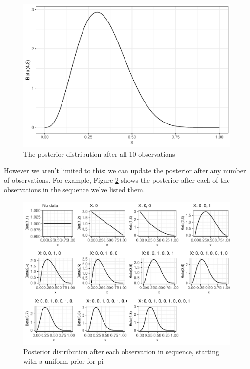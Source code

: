\documentclass[
  openany]{book}
\theoremstyle{definition}
\theoremstyle{definition}
\theoremstyle{definition}
\theoremstyle{definition}
\theoremstyle{remark}
\begin{document}
\begin{figure}
\centering
\includegraphics{CT4H_notes_files/figure-latex/betafinal-1.pdf}
\caption{\label{fig:betafinal}The posterior distribution after all 10 observations}
\end{figure}

However we aren't limited to this: we can update the posterior after any number of observations. For example, Figure \ref{fig:betaplots} shows the posterior after each of the observations in the sequence we've listed them.

\begin{figure}
\centering
\includegraphics{CT4H_notes_files/figure-latex/betaplots-1.pdf}
\caption{\label{fig:betaplots}Posterior distribution after each observation in sequence, starting with a uniform prior for pi}
\end{figure}
\end{document}
